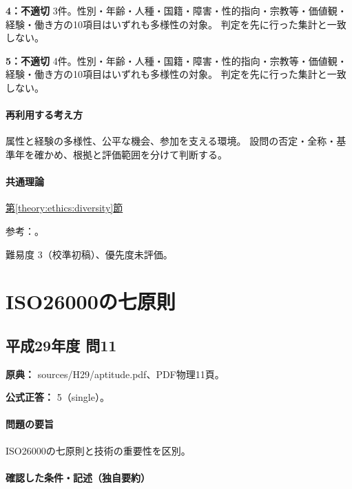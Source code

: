 \noindent\textbf{4：不適切} 3件。性別・年齢・人種・国籍・障害・性的指向・宗教等・価値観・経験・働き方の10項目はいずれも多様性の対象。 判定を先に行った集計と一致しない。\par

\noindent\textbf{5：不適切} 4件。性別・年齢・人種・国籍・障害・性的指向・宗教等・価値観・経験・働き方の10項目はいずれも多様性の対象。 判定を先に行った集計と一致しない。\par

\paragraph{再利用する考え方} 属性と経験の多様性、公平な機会、参加を支える環境。 設問の否定・全称・基準年を確かめ、根拠と評価範囲を分けて判断する。

\paragraph{共通理論} \hyperref[theory:ethics:diversity]{第\ref*{theory:ethics:diversity}節}

\par 参考：\cite{eth54_dei2025}。

\par 難易度 3（校準初稿）、優先度未評価。

\section{ISO26000の七原則}

\subsection{平成29年度 問11}
\label{q:h29-reg-apt-11}

\noindent\textbf{原典：} sources/H29/aptitude.pdf、PDF物理11頁。

\textbf{公式正答：} 5（single）。

\paragraph{問題の要旨} ISO26000の七原則と技術の重要性を区別。

\paragraph{確認した条件・記述（独自要約）}\mbox{}\par

